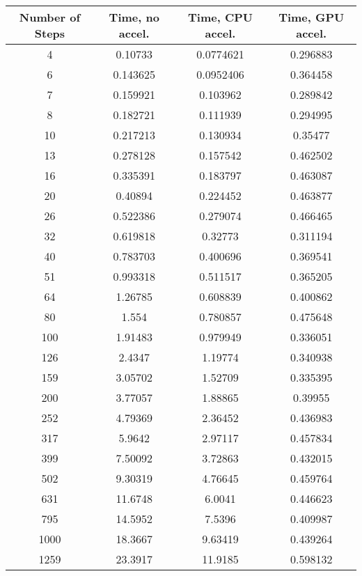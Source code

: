 \begin{table}[ht!]
    \centering
    {\footnotesize
        \begin{tabular}{| c | c c c |}
            \hline
            Number of Steps  & Time, no accel.  & Time, CPU accel. &  Time, GPU accel. \\
            \hline
            4 & 0.10733  & 0.0774621 & 0.296883 \\
            6 & 0.143625 & 0.0952406 & 0.364458 \\
            7 & 0.159921 & 0.103962  & 0.289842 \\
            8 & 0.182721 & 0.111939  & 0.294995 \\
            10 & 0.217213 & 0.130934  & 0.35477 \\
            13 & 0.278128 & 0.157542  & 0.462502 \\
            16 & 0.335391 & 0.183797  & 0.463087 \\ 
            20 & 0.40894  & 0.224452  & 0.463877 \\ 
            26 & 0.522386 & 0.279074  & 0.466465 \\
            32 & 0.619818 & 0.32773  & 0.311194 \\
            40 & 0.783703 & 0.400696 & 0.369541 \\
            51 & 0.993318 & 0.511517 & 0.365205 \\
            64 & 1.26785  & 0.608839 & 0.400862 \\
            80 & 1.554    & 0.780857 & 0.475648 \\
        100 & 1.91483  & 0.979949 & 0.336051 \\
        126 & 2.4347   & 1.19774  & 0.340938 \\
        159 & 3.05702  & 1.52709  & 0.335395 \\
        200 & 3.77057  & 1.88865  & 0.39955 \\
        252 & 4.79369  & 2.36452  & 0.436983 \\
        317 &  5.9642  &  2.97117 & 0.457834 \\
        399 &  7.50092 &  3.72863 & 0.432015 \\
        502 &  9.30319 &  4.76645 & 0.459764 \\ 
        631 & 11.6748  &  6.0041  & 0.446623 \\
        795 & 14.5952  &  7.5396  & 0.409987 \\ 
        1000 & 18.3667  &  9.63419 & 0.439264 \\
        1259 & 23.3917  & 11.9185  & 0.598132 \\ 

\end{tabular}}
\end{table}
